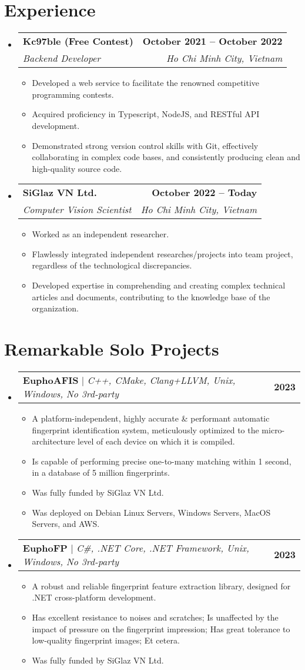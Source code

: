 \documentclass[letterpaper,11pt]{article}
\makeatletter
\newcommand{\resumeItem}[1]{
\item\small{
{#1 \vspace{-2pt}}
}
}
\newcommand{\resumeSubheading}[4]{
\vspace{-2pt}\item
\begin{tabular*}{1.0\textwidth}[t]{l@{\extracolsep{\fill}}r}
\textbf{#1} & \textbf{\small #2} \\
\textit{\small#3} & \textit{\small #4} \\
    \end{tabular*}\vspace{-7pt}
}
\newcommand{\resumeProjectHeading}[2]{
\item
\begin{tabular*}{1.001\textwidth}{l@{\extracolsep{\fill}}r}
\small#1 & \textbf{\small #2}\\
\end{tabular*}\vspace{-7pt}
}
\newcommand{\resumeSubHeadingListStart}{\begin{itemize}[leftmargin=0.0in, label={}]}
\newcommand{\resumeSubHeadingListEnd}{\end{itemize}}
\newcommand{\resumeItemListStart}{\begin{itemize}}
\newcommand{\resumeItemListEnd}{\end{itemize}\vspace{-5pt}}
\makeatother
\begin{document}
\section{Experience}
\resumeSubHeadingListStart

\resumeSubheading
{Kc97ble (Free Contest)}{October 2021 -- October 2022}
{Backend Developer}{Ho Chi Minh City, Vietnam}
\resumeItemListStart
\resumeItem{Developed a web service to facilitate the renowned competitive programming contests.}
\resumeItem{Acquired proficiency in Typescript, NodeJS, and RESTful API development.}
\resumeItem{Demonstrated strong version control skills with Git, effectively collaborating in complex code bases, and consistently producing clean and high-quality source code.}
\resumeItemListEnd

\resumeSubheading
{SiGlaz VN Ltd.}{October 2022 -- Today}
{Computer Vision Scientist}{Ho Chi Minh City, Vietnam}
\resumeItemListStart
\resumeItem{Worked as an independent researcher.}
\resumeItem{Flawlessly integrated independent researches/projects into team project, regardless of the technological discrepancies.}
\resumeItem{Developed expertise in comprehending and creating complex technical articles and documents, contributing to the knowledge base of the organization.}
\resumeItemListEnd

\resumeSubHeadingListEnd
\vspace{-16pt}


\section{Remarkable Solo Projects}
\vspace{-5pt}
\resumeSubHeadingListStart
\resumeProjectHeading
{\textbf{EuphoAFIS} $|$ \emph{C++, CMake, Clang+LLVM, Unix, Windows, No 3rd-party}}{2023}
\resumeItemListStart
\resumeItem{A platform-independent, highly accurate \& performant automatic fingerprint identification system, meticulously optimized to the micro-architecture level of each device on which it is compiled.}
\resumeItem{Is capable of performing precise one-to-many matching within 1 second, in a database of 5 million fingerprints.}
\resumeItem{Was fully funded by SiGlaz VN Ltd.}
\resumeItem{Was deployed on Debian Linux Servers, Windows Servers, MacOS Servers, and AWS.}
\resumeItemListEnd
\vspace{-13pt}
\resumeProjectHeading
{\textbf{EuphoFP} $|$ \emph{C\#, .NET Core, .NET Framework, Unix, Windows, No 3rd-party}}{2023}
\resumeItemListStart
\resumeItem{A robust and reliable fingerprint feature extraction library, designed for .NET cross-platform development.}
\resumeItem{Has excellent resistance to noises and scratches; Is unaffected by the impact of pressure on the fingerprint impression; Has great tolerance to low-quality fingerprint images; Et cetera.}
\resumeItem{Was fully funded by SiGlaz VN Ltd.}
\resumeItemListEnd
\resumeSubHeadingListEnd
\vspace{-15pt}
\end{document}
